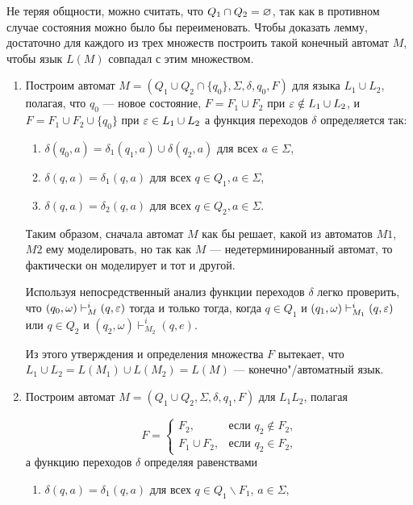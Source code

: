 \begin{myproof}
Не теряя общности, можно считать, что $Q_1\cap Q_2=\varnothing$, так как в противном случае состояния можно было бы переименовать. Чтобы доказать лемму, достаточно для каждого из трех множеств построить такой конечный автомат $M$, чтобы язык $L(M)$ совпадал с этим множеством.
\begin{enumerate}
\item Построим автомат $M=(Q_1\cup Q_2\cap\{q_0\},\Sigma,\delta,q_0,F)$ для языка $L_1\cup L_2$, полагая, что $q_0$ --- новое состояние, $F=F_1\cup F_2$ при $\varepsilon\notin L_1\cup L_2$, и $F=F_1\cup F_2\cup\{q_0\}$ при $\varepsilon\in L_1\cup L_2$ а функция переходов $\delta$ определяется так:
\begin{enumerate}[label=(\emph{\roman*})]
\item $\delta(q_0,a)=\delta_1(q_1,a)\cup\delta(q_2,a)$ для всех $a\in\Sigma$,
\item $\delta(q,a)=\delta_1(q,a)$ для всех $q\in Q_1, a\in\Sigma$,
\item $\delta(q,a)=\delta_2(q,a)$ для всех $q\in Q_2, a\in\Sigma$.
\end{enumerate}
Таким образом, сначала автомат $M$ как бы решает, какой из автоматов $M1$, $M2$ ему моделировать, но так как $M$ --- недетерминированный автомат, то фактически он моделирует и тот и другой.

Используя непосредственный анализ функции переходов $\delta$ легко проверить, что $(q_0,\omega)\vdash_M^i(q,\varepsilon)$ тогда и только тогда, когда $q\in Q_1$ и $(q_1,\omega)\vdash_{M_1}^i(q,\varepsilon)$ или $q\in Q_2$ и $(q_2,\omega)\vdash_{M_2}^i(q,e)$.

Из этого утверждения и определения множества $F$ вытекает, что $L_1\cup L_2=L(M_1)\cup L(M_2)=L(M)$ --- конечно"/автоматный язык.

\item Построим автомат $M=(Q_1\cup Q_2,\Sigma,\delta,q_1,F)$ для $L_1L_2$, полагая

\begin{equation*}
F =
\begin{cases}
	F_2, & \text{если $q_2\notin F_2$,} \\
	F_1\cup F_2, & \text{если $q_2\in F_2$,}
\end{cases}
\end{equation*}
а функцию переходов $\delta$ определяя равенствами
\begin{enumerate}[label=(\emph{\roman*})]
\item $\delta(q,a)=\delta_1(q,a)$ для всех $q\in Q_1\backslash F_1$, $a\in\Sigma$,


\end{enumerate}
\end{enumerate}
\end{myproof}
